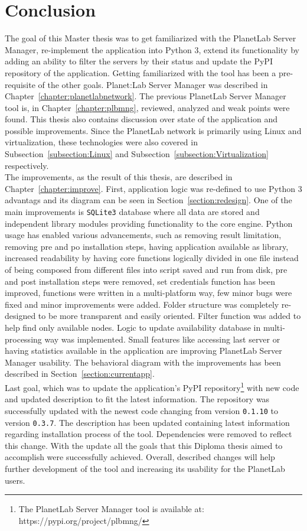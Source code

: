 \chapter{Conclusion}
The goal of this Master thesis was to get familiarized with the PlanetLab Server Manager, re-implement the application into Python 3, extend its functionality by adding an ability to filter the servers by their status and update the PyPI repository of the application. Getting familiarized with the tool has been a pre-requisite of the other goals. Planet:Lab Server Manager was described in Chapter~\ref{chapter:planetlabnetwork}. The previous PlanetLab Server Manager tool is, in Chapter~\ref{chapter:plbmng}, reviewed, analyzed and weak points were found. This thesis also contains discussion over state of the application and possible improvements. Since the PlanetLab network is primarily using Linux and virtualization, these technologies were also covered in Subsection~\ref{subsection:Linux} and Subsection~\ref{subsection:Virtualization} respectively.\\
The improvements, as the result of this thesis, are described in Chapter~\ref{chapter:improve}. First, application logic was re-defined to use Python 3 advantags and its diagram can be seen in Section~\ref{section:redesign}. One of the main improvements is \texttt{SQLite3} database where all data are stored and independent library modules providing functionality to the core engine. Python usage has enabled various advancements, such as removing result limitation, removing pre and po installation steps, having application available as library, increased readability by having core functions logically divided in one file instead of being composed from different files into script saved and run from disk, pre and post installation steps were removed, set credentials function has been improved, functions were written in a multi-platform way, few minor bugs were fixed and minor improvements were added. Folder structure was completely re-designed to be more transparent and easily oriented. Filter function was added to help find only available nodes. Logic to update availability database in multi-processing way was implemented. Small features like accessing last server or having statistics available in the application are improving PlanetLab Server Manager usability. The behavioral diagram with the improvements has been described in Section~\ref{section:currentapp}.\\
Last goal, which was to update the application's PyPI repository\footnote{The PlanetLab Server Manager tool is available at: https://pypi.org/project/plbmng/} with new code and updated description to fit the latest information. The repository was successfully updated with the newest code changing from version \texttt{0.1.10} to version \texttt{0.3.7}. The description has been updated containing latest information regarding installation process of the tool. Dependencies were removed to reflect this change. With the update all the goals that this Diploma thesis aimed to accomplish were successfully achieved. Overall, described changes will help further development of the tool and increasing its usability for the PlanetLab users.